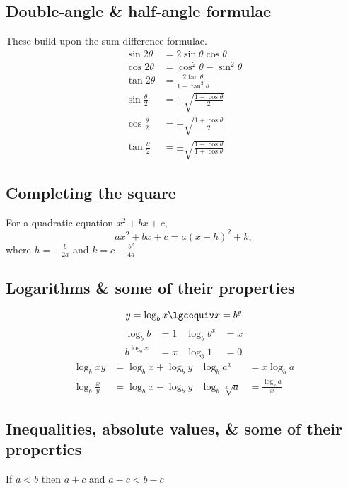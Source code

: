 \documentclass[main.tex]{subfiles}
\begin{document}
\begin{multicols}{2}
		\subsection*{Double-angle \& half-angle formulae}
		These build upon the sum-difference formulae.
		\begin{align*}
			\sin{2\theta} &= 2\sin{\theta}\cos{\theta} \\
			\cos{2\theta} &= \cos^2{\theta} - \sin^2{\theta} \\
			\tan{2\theta} &= \frac{2\tan{\theta}}{1 - \tan^2\theta} \\
			\sin{\frac{\theta}{2}} &= \pm \sqrt{\frac{1 - \cos\theta}{2}} \\
			\cos{\frac{\theta}{2}} &= \pm \sqrt{\frac{1 + \cos\theta}{2}}\\
			\tan{\frac{\theta}{2}} &= \pm \sqrt{\frac{1 - \cos\theta}{1 + \cos\theta}}
		\end{align*}

		\subsection*{Completing the square}
		For a quadratic equation \(x^2 + bx + c,\) \[
			ax^2 + bx + c = a(x - h)^2 + k,
		\]
		where \(h = -\frac{b}{2a}\) and \(k = c - \frac{b^2}{4a}\)

		\subsection*{Logarithms \& some of their properties}
		\[y = \log_{b}x \lgcequiv x = b^{y}\]
		\begin{align*}
			\log_{b}{b} &= 1 & \log_{b}{b^x} &= x \\
			b^{\log_{b}{x}} &= x & \log_{b}{1} &= 0
		\end{align*}
		\begin{align*}
			\log_{b}{xy} &= \log_{b}{x} + \log_{b}{y} & \log_{b}{a^x} &= x \log_{b}{a} \\
			\log_{b}{\frac{x}{y}} &= \log_{b}{x} - \log_{b}{y} & \log_{b}{\sqrt[x]{a}} &= \frac{\log_{b}{a}}{x}
		\end{align*}

		\subsection*{Inequalities, absolute values, \& some of their properties}
		If \(a < b\) then \(a + c\) and \(a - c < b - c\)


\end{multicols}
\end{document}
